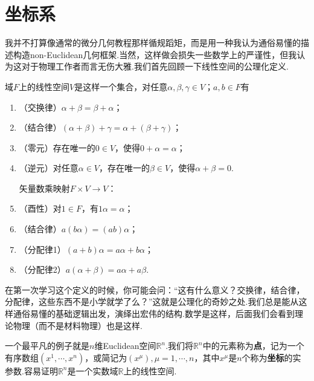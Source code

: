 \section{坐标系}
	我并不打算像通常的微分几何教程那样循规蹈矩，而是用一种我认为通俗易懂的描述构造non-Euclidean几何框架.当然，这样做会损失一些数学上的严谨性，但我认为这对于物理工作者而言无伤大雅.我们首先回顾一下线性空间的公理化定义.
		\begin{definition}
			域$F$上的线性空间$V$是这样一个集合，对任意$\alpha,\beta,\gamma\in V$；$a,b\in F$有
			\begin{enumerate}
				矢量加法映射$V\times V\rightarrow V$：
				\item （交换律）$\alpha+\beta=\beta+\alpha$；
				\item （结合律）$(\alpha+\beta)+\gamma=\alpha+(\beta+\gamma)$；
				\item （零元）存在唯一的$0\in V$，使得$0+\alpha=\alpha$；
				\item （逆元）对任意$\alpha\in V$，存在唯一的$\beta\in V$，使得$\alpha+\beta=0$.
					
				矢量数乘映射$F\times V\rightarrow V$：
				\item （酉性）对$1\in F$，有$1\alpha=\alpha$；
				\item （结合律）$a(b\alpha)=(ab)\alpha$；
				\item （分配律1）$(a+b)\alpha=a\alpha+b\alpha$；
				\item （分配律2）$a(\alpha+\beta)=a\alpha+a\beta$.
			\end{enumerate}
		\end{definition}
	在第一次学习这个定义的时候，你可能会问：“这有什么意义？交换律，结合律，分配律，这些东西不是小学就学了么？”这就是公理化的奇妙之处.我们总是能从这样通俗易懂的基础逻辑出发，演绎出宏伟的结构.数学是这样，后面我们会看到理论物理（而不是材料物理）也是这样.
			
	一个最平凡的例子就是$n$维Euclidean空间$\mathbb{R}^n$.我们将$\mathbb{R}^n$中的元素称为\textbf{点}，记为一个有序数组$(x^1,\cdots,x^n)$，或简记为$(x^\mu),\mu=1,\cdots,n$，其中$x^\mu$是$n$个称为\textbf{坐标}的实参数.容易证明$\mathbb{R}^n$是一个实数域$\mathbb{R}$上的线性空间.
			
